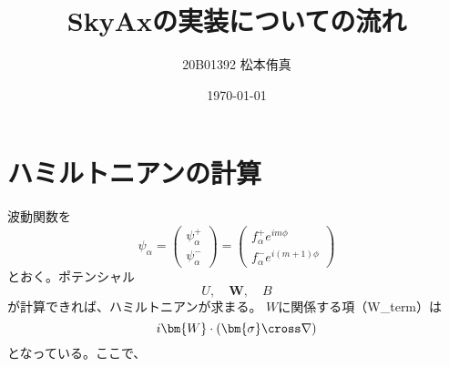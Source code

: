 \documentclass[a4paper,11pt,titlepage,uplatex]{jsarticle}
\title{SkyAxの実装についての流れ}
\author{20B01392 松本侑真}
\date{\today}
\begin{document}
\maketitle
\begin{abstract}

\end{abstract}
\tableofcontents
\newpage

\section{ハミルトニアンの計算}
波動関数を
\begin{equation}
    \psi_{\alpha} = 
    \begin{pmatrix}
      \psi_{\alpha}^{+} \\
      \psi_{\alpha}^{-}
    \end{pmatrix}
     = 
    \begin{pmatrix}
      f_{\alpha}^{+}e^{im\phi} \\
      f_{\alpha}^{-}e^{i(m+1)\phi}
    \end{pmatrix}
\end{equation}
とおく。ポテンシャル
\begin{equation}
  U,\quad \bm{W},\quad B
\end{equation}
が計算できれば、ハミルトニアンが求まる。
$W$に関係する項（W\_term）は
\begin{equation}
  i\bm{W}\cdot(\bm{\sigma}\cross\nabla)
\end{equation}
となっている。ここで、
\end{document}
